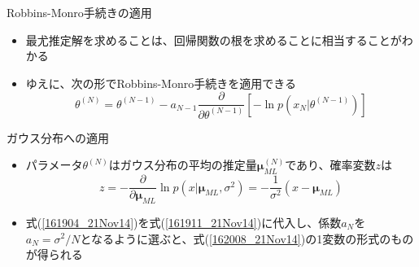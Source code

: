 \begin{frame}{Robbins-Monro手続きの適用}
 \begin{itemize}
  \item 最尤推定解を求めることは、回帰関数の根を求めることに相当することがわかる
  \item ゆえに、次の形でRobbins-Monro手続きを適用できる
        \begin{equation}
         \theta^{(N)}=\theta^{(N-1)}-a_{N-1}\frac{\partial}{\partial \theta^{(N-1)}}[-\ln p(x_N|\theta^{(N-1)})]\label{161911_21Nov14}
        \end{equation}
 \end{itemize}
\end{frame}

\begin{frame}{ガウス分布への適用}
 \begin{itemize}
  \item パラメータ$\theta^{(N)}$はガウス分布の平均の推定量$\bm{\mu}_{ML}^{(N)}$であり、確率変数$z$は
        \begin{equation}
         z=-\frac{\partial}{\partial \bm{\mu}_{ML}} \ln p(x|\bm{\mu}_{ML}, \sigma^2) = -\frac{1}{\sigma^2}(x-\bm{\mu}_{ML})\label{161904_21Nov14}
        \end{equation}
  \item 式(\ref{161904_21Nov14})を式(\ref{161911_21Nov14})に代入し、係数$a_N$を$a_N=\sigma^2/N$となるように選ぶと、式(\ref{162008_21Nov14})の1変数の形式のものが得られる
 \end{itemize}
\end{frame}
